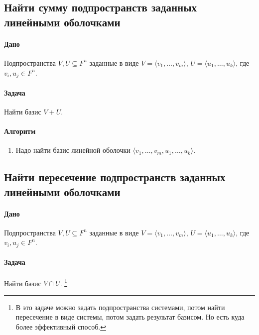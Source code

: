 \documentclass{article}
\begin{document}
\subsection{Найти сумму подпространств заданных линейными оболочками}

\paragraph{Дано}

Подпространства $V,U\subseteq F^{n}$ заданные в виде $V = \langle v_1,\ldots,v_m\rangle$, $U = \langle u_1,\ldots,u_k\rangle$, где $v_i,u_j\in F^{n}$.

\paragraph{Задача}

Найти базис $V + U$.

\paragraph{Алгоритм}

\begin{enumerate}
\item Надо найти базис линейной оболочки $\langle v_1,\ldots,v_m,u_1,\ldots,u_k\rangle$.
\end{enumerate}

\subsection{Найти пересечение подпространств заданных линейными оболочками}

\paragraph{Дано}

Подпространства $V,U\subseteq F^{n}$ заданные в виде $V = \langle v_1,\ldots,v_m\rangle$, $U = \langle u_1,\ldots,u_k\rangle$, где $v_i,u_j\in F^{n}$.

\paragraph{Задача}

Найти базис $V\cap U$.%
\footnote{В это задаче можно задать подпространства системами, потом найти пересечение в виде системы, потом задать результат базисом.
Но есть куда более эффективный способ.}
\end{document}
